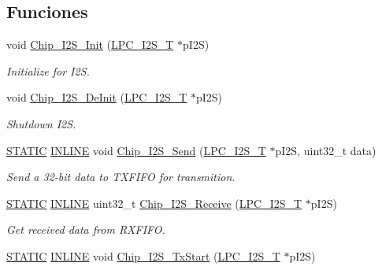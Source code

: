 \subsection*{Funciones}
\begin{DoxyCompactItemize}
\item 
void \hyperlink{group___i2_s__18_x_x__43_x_x_ga006752f0240a956ae02fba521e63c053}{Chip\+\_\+\+I2\+S\+\_\+\+Init} (\hyperlink{struct_l_p_c___i2_s___t}{L\+P\+C\+\_\+\+I2\+S\+\_\+T} $\ast$p\+I2S)
\begin{DoxyCompactList}\small\item\em Initialize for I2S. \end{DoxyCompactList}\item 
void \hyperlink{group___i2_s__18_x_x__43_x_x_ga2fbdb14520735214e155253f05a88a0a}{Chip\+\_\+\+I2\+S\+\_\+\+De\+Init} (\hyperlink{struct_l_p_c___i2_s___t}{L\+P\+C\+\_\+\+I2\+S\+\_\+T} $\ast$p\+I2S)
\begin{DoxyCompactList}\small\item\em Shutdown I2S. \end{DoxyCompactList}\item 
\hyperlink{group___l_p_c___types___public___macros_ga10b2d890d871e1489bb02b7e70d9bdfb}{S\+T\+A\+T\+IC} \hyperlink{spifi__18xx__43xx_8h_a2eb6f9e0395b47b8d5e3eeae4fe0c116}{I\+N\+L\+I\+NE} void \hyperlink{group___i2_s__18_x_x__43_x_x_ga7927122545d8ec1879743fb8caffb723}{Chip\+\_\+\+I2\+S\+\_\+\+Send} (\hyperlink{struct_l_p_c___i2_s___t}{L\+P\+C\+\_\+\+I2\+S\+\_\+T} $\ast$p\+I2S, uint32\+\_\+t data)
\begin{DoxyCompactList}\small\item\em Send a 32-\/bit data to T\+X\+F\+I\+FO for transmition. \end{DoxyCompactList}\item 
\hyperlink{group___l_p_c___types___public___macros_ga10b2d890d871e1489bb02b7e70d9bdfb}{S\+T\+A\+T\+IC} \hyperlink{spifi__18xx__43xx_8h_a2eb6f9e0395b47b8d5e3eeae4fe0c116}{I\+N\+L\+I\+NE} uint32\+\_\+t \hyperlink{group___i2_s__18_x_x__43_x_x_ga74005245ee6b79220df6a563db92a04f}{Chip\+\_\+\+I2\+S\+\_\+\+Receive} (\hyperlink{struct_l_p_c___i2_s___t}{L\+P\+C\+\_\+\+I2\+S\+\_\+T} $\ast$p\+I2S)
\begin{DoxyCompactList}\small\item\em Get received data from R\+X\+F\+I\+FO. \end{DoxyCompactList}\item 
\hyperlink{group___l_p_c___types___public___macros_ga10b2d890d871e1489bb02b7e70d9bdfb}{S\+T\+A\+T\+IC} \hyperlink{spifi__18xx__43xx_8h_a2eb6f9e0395b47b8d5e3eeae4fe0c116}{I\+N\+L\+I\+NE} void \hyperlink{group___i2_s__18_x_x__43_x_x_ga84f5b666dcacef8140c1355ed308a782}{Chip\+\_\+\+I2\+S\+\_\+\+Tx\+Start} (\hyperlink{struct_l_p_c___i2_s___t}{L\+P\+C\+\_\+\+I2\+S\+\_\+T} $\ast$p\+I2S)

\end{DoxyCompactItemize}
